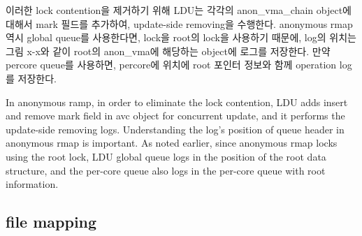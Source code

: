 \ifkor
이러한 lock contention을 제거하기 위해 LDU는 각각의 anon\_vma\_chain object에 대해서
mark 필드를 추가하여, update-side removing을 수행한다.
anonymous rmap역시 global queue를 사용한다면, lock을 root의 lock을 사용하기 때문에, log의 위치는 그림
x-x와 같이 root의 anon\_vma에 해당하는 object에 로그를 저장한다. 
만약 percore queue를 사용하면, percore에 위치에 root 포인터 정보와 함께 operation log를 저장한다.
\else

In anonymous ramp, in order to eliminate the lock contention, LDU adds insert
and remove mark field in avc object for concurrent update, and it performs the
update-side removing logs.
Understanding the log's position of queue header in anonymous rmap is important.
As noted earlier, since anonymous rmap locks using the root lock, LDU global
queue logs in the position of the root data structure, and the per-core queue
also logs in the per-core queue with root information.
\fi


\subsection{file mapping}

